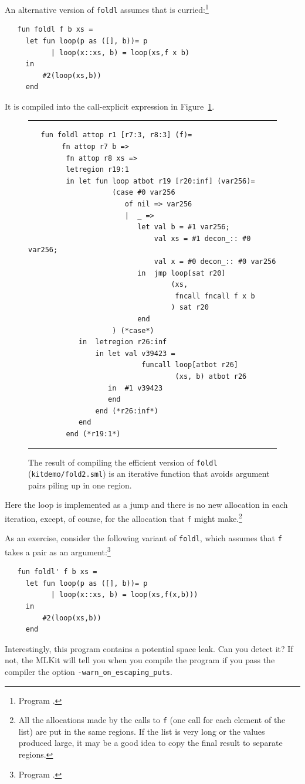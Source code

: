 \documentclass[12pt]{book}
\begin{document}
An alternative version of {\tt foldl} assumes that 
is curried:\footnote{Program .}
\begin{verbatim}
   fun foldl f b xs = 
     let fun loop(p as ([], b))= p
           | loop(x::xs, b) = loop(xs,f x b)
     in
         #2(loop(xs,b))
     end
\end{verbatim}
It is compiled into the call-explicit expression in
Figure~\ref{fold2.fig}.
\begin{figure}
\hrule \medskip
\begin{verbatim}
   fun foldl attop r1 [r7:3, r8:3] (f)= 
        fn attop r7 b => 
         fn attop r8 xs => 
         letregion r19:1 
         in let fun loop atbot r19 [r20:inf] (var256)= 
                    (case #0 var256 
                       of nil => var256
                       |  _ => 
                          let val b = #1 var256; 
                              val xs = #1 decon_:: #0 var256; 
                              val x = #0 decon_:: #0 var256
                          in  jmp loop[sat r20] 
                                  (xs, 
                                   fncall fncall f x b
                                  ) sat r20
                          end 
                    ) (*case*) 
            in  letregion r26:inf 
                in let val v39423 = 
                           funcall loop[atbot r26] 
                                   (xs, b) atbot r26
                   in  #1 v39423
                   end  
                end (*r26:inf*)
            end  
         end (*r19:1*)
\end{verbatim}
\caption{The result of compiling the efficient version of {\tt foldl} 
  ({\tt kitdemo/fold2.sml}) is an iterative function that avoids
  argument pairs piling up in one region.}  \medskip \hrule
\label{fold2.fig}
\end{figure}
Here the loop is implemented as a jump and there is no new allocation
in each iteration, except, of course, for the allocation that {\tt f}
might make.\footnote{All the allocations made by the calls to {\tt f}
  (one call for each element of the list) are put in the same regions.
  If the list is very long or the values produced large, it may be a
  good idea to copy the final result to separate regions.}

As an exercise, consider the following variant of {\tt foldl}, which
assumes that {\tt f} takes a pair as an argument:\footnote{Program
  .}
\begin{verbatim}
   fun foldl' f b xs = 
     let fun loop(p as ([], b))= p
           | loop(x::xs, b) = loop(xs,f(x,b)))
     in
         #2(loop(xs,b))
     end
\end{verbatim}
Interestingly, this program contains a potential space leak. Can you
detect it? If not, the MLKit will tell you when you compile the
program if you pass the compiler the option
\texttt{-warn\_on\_escaping\_puts}.
\end{document}
